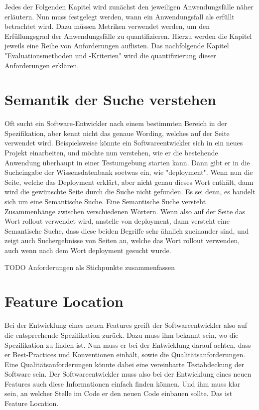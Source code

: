 Jedes der Folgenden Kapitel wird zunächst den jeweiligen Anwendungsfälle näher erläutern.
Nun muss festgelegt werden, wann ein Anwendungsfall als erfüllt betrachtet wird.
Dazu müssen Metriken verwendet werden, um den Erfüllungsgrad der Anwendungsfälle zu quantifizieren.
Hierzu werden die Kapitel jeweils eine Reihe von Anforderungen auflisten.
Das nachfolgende Kapitel "Evaluationsmethoden und -Kriterien" wird die quantifizierung dieser Anforderungen erklären. 

\section{Semantik der Suche verstehen}
Oft sucht ein Software-Entwickler nach einem bestimmten Bereich in der Spezifikation, aber kennt nicht das genaue Wording, welches auf der Seite verwendet wird.
Beispielsweise könnte ein Softwareentwickler sich in ein neues Projekt einarbeiten, und möchte nun verstehen, wie er die bestehende Anwendung überhaupt in einer Testumgebung starten kann.
Dann gibt er in die Sucheingabe der Wissensdatenbank soetwas ein, wie "deployment".
Wenn nun die Seite, welche das Deployment erklärt, aber nicht genau dieses Wort enthält, dann wird die gewünschte Seite durch die Suche nicht gefunden.
Es sei denn, es handelt sich um eine Semantische Suche.
Eine Semantische Suche versteht Zusammenhänge zwischen verschiedenen Wörtern.
Wenn also auf der Seite das Wort rollout verwendet wird, anstelle von deployment, dann versteht eine Semantische Suche, dass diese beiden Begriffe sehr ähnlich zueinander sind, und zeigt auch Suchergebnisse von Seiten an, welche das Wort rollout verwenden, auch wenn nach dem Wort deployment gesucht wurde.

TODO Anforderungen als Stichpunkte zusammenfassen

\section{Feature Location}
Bei der Entwicklung eines neuen Features greift der Softwareentwickler also auf die entsprechende Spezifikation zurück.
Dazu muss ihm bekannt sein, wo die Spezifikation zu finden ist.
Nun muss er bei der Entwicklung darauf achten, dass er Best-Practices und Konventionen einhält, sowie die Qualitätsanforderungen.
Eine Qualitätsanforderungen könnte dabei eine vereinbarte Testabdeckung der Software sein.
Der Softwareentwickler muss also bei der Entwicklung eines neuen Features auch diese Informationen einfach finden können.
Und ihm muss klar sein, an welcher Stelle im Code er den neuen Code einbauen sollte.
Das ist Feature Location.

